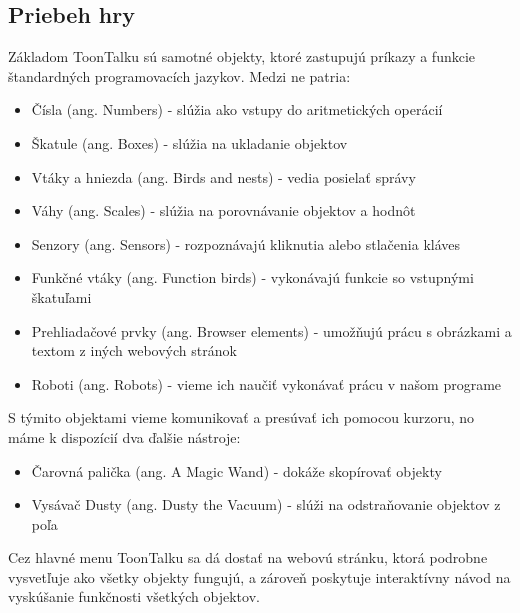 \documentclass[slovak,a4paper,11pt]{article}
\begin{document}
\subsection{Priebeh hry}
Základom ToonTalku sú samotné objekty, ktoré zastupujú príkazy a funkcie štandardných programovacích jazykov. Medzi ne patria:
\begin{itemize}
\item Čísla (ang. Numbers) - slúžia ako vstupy do aritmetických operácií
\item Škatule (ang. Boxes) - slúžia na ukladanie objektov
\item Vtáky a hniezda (ang. Birds and nests) - vedia posielať správy
\item Váhy (ang. Scales) - slúžia na porovnávanie objektov a hodnôt
\item Senzory (ang. Sensors) - rozpoznávajú kliknutia alebo stlačenia kláves
\item Funkčné vtáky (ang. Function birds) - vykonávajú funkcie so vstupnými škatuľami
\item Prehliadačové prvky (ang. Browser elements) - umožňujú prácu s obrázkami a textom z iných webových stránok
\item Roboti (ang. Robots) - vieme ich naučiť vykonávať prácu v našom programe
\end{itemize}
S týmito objektami vieme komunikovať a presúvať ich pomocou kurzoru, no máme k dispozícií dva ďalšie nástroje:
\begin{itemize}
\item Čarovná palička (ang. A Magic Wand) - dokáže skopírovať objekty
\item Vysávač Dusty (ang. Dusty the Vacuum) - slúži na odstraňovanie objektov z poľa
\end{itemize}
Cez hlavné menu ToonTalku sa dá dostať na webovú stránku, ktorá podrobne vysvetľuje ako všetky objekty fungujú, a zároveň poskytuje interaktívny návod na vyskúšanie funkčnosti všetkých objektov.
\vspace{1cm}
\end{document}
